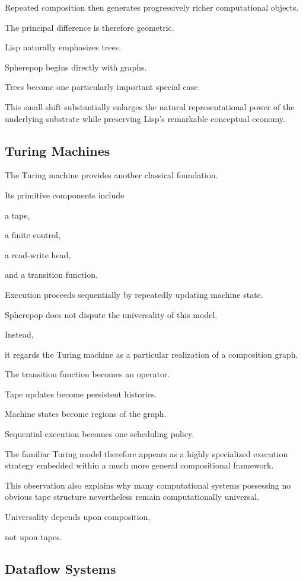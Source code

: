 \documentclass[12pt,oneside]{article}
\begin{document}
Repeated composition then generates progressively richer computational objects.

The principal difference is therefore geometric.

Lisp naturally emphasizes trees.

Spherepop begins directly with graphs.

Trees become one particularly important special case.

This small shift substantially enlarges the natural representational power of the underlying substrate while preserving Lisp's remarkable conceptual economy.

\subsection{Turing Machines}

The Turing machine provides another classical foundation.

Its primitive components include

a tape,

a finite control,

a read-write head,

and a transition function.

Execution proceeds sequentially by repeatedly updating machine state.

Spherepop does not dispute the universality of this model.

Instead,

it regards the Turing machine as a particular realization of a composition graph.

The transition function becomes an operator.

Tape updates become persistent histories.

Machine states become regions of the graph.

Sequential execution becomes one scheduling policy.

The familiar Turing model therefore appears as a highly specialized execution strategy embedded within a much more general compositional framework.

This observation also explains why many computational systems possessing no obvious tape structure nevertheless remain computationally universal.

Universality depends upon composition,

not upon tapes.

\subsection{Dataflow Systems}
\end{document}
